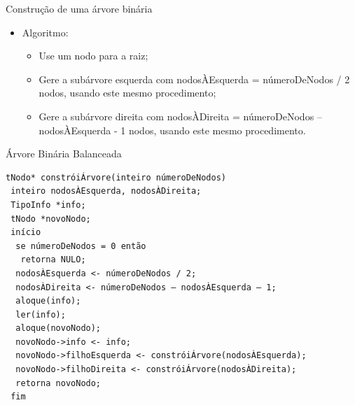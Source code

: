 \documentclass[12pt,table,xcolor={dvipsnames}]{beamer}
\begin{document}
\begin{frame}[fragile]{Construção de uma árvore binária}
          \begin{itemize}
          \item Algoritmo:
          \begin{itemize}
          \item Use um nodo para a raiz;
          \item Gere a subárvore esquerda com nodosÀEsquerda = númeroDeNodos / 2 nodos, usando este mesmo procedimento;
          \item Gere a subárvore direita com nodosÀDireita = númeroDeNodos – nodosÀEsquerda - 1 nodos, usando este mesmo procedimento.
          \end{itemize}
       	  \end{itemize}
\end{frame}

\begin{frame}[fragile]{Árvore Binária Balanceada}
          \begin{lstlisting}
tNodo* constróiÁrvore(inteiro númeroDeNodos)
 inteiro nodosÀEsquerda, nodosÀDireita;
 TipoInfo *info;
 tNodo *novoNodo;
 início
  se númeroDeNodos = 0 então
   retorna NULO;
  nodosÀEsquerda <- númeroDeNodos / 2;
  nodosÀDireita <- númeroDeNodos – nodosÀEsquerda – 1;
  aloque(info);
  ler(info);
  aloque(novoNodo);
  novoNodo->info <- info;
  novoNodo->filhoEsquerda <- constróiÁrvore(nodosÀEsquerda);
  novoNodo->filhoDireita <- constróiÁrvore(nodosÀDireita);
  retorna novoNodo;
 fim
		  \end{lstlisting}

\end{frame} 
\end{document}
